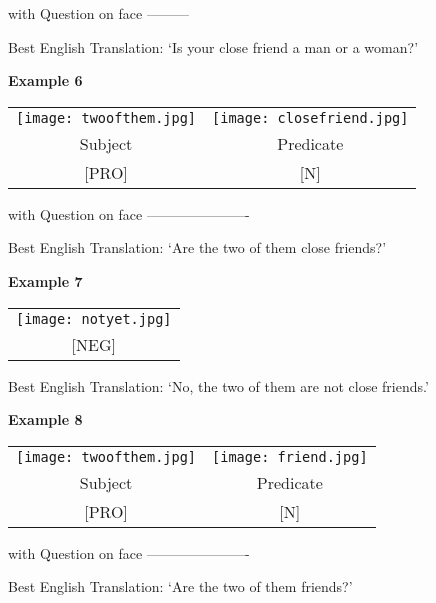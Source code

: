 \documentclass{tufte-book}
\begin{document}
\hspace{5.5cm} with Question on face ---------

Best English Translation: `Is your close friend a man or a woman?'

\vspace{0.25cm}\noindent \textbf{Example 6}
\begin{table*}[h!]
\begin{tabular}{c | c}
\texttt{[image: twoofthem.jpg]}&\texttt{[image: closefriend.jpg]}\\
\footnotesize Subject & \footnotesize Predicate\\
\footnotesize [PRO] & \footnotesize [N] \\
\end{tabular}
\end{table*}

\noindent with Question on face ----------------------

Best English Translation: `Are the two of them close friends?'

\newpage

\noindent \textbf{Example 7}
\begin{table*}[h!]
\begin{tabular}{c}
\texttt{[image: notyet.jpg]}\\
\footnotesize [NEG] \\
\end{tabular}
\end{table*}

Best English Translation: `No, the two of them are not close friends.'

\vspace{0.25cm}\noindent \textbf{Example 8}
\begin{table*}[h!]
\begin{tabular}{c | c}
\texttt{[image: twoofthem.jpg]}&\texttt{[image: friend.jpg]}\\
\footnotesize Subject & \footnotesize Predicate\\
\footnotesize [PRO] & \footnotesize [N] \\
\end{tabular}
\end{table*}

\noindent with Question on face ----------------------

Best English Translation: `Are the two of them friends?'
\end{document}
